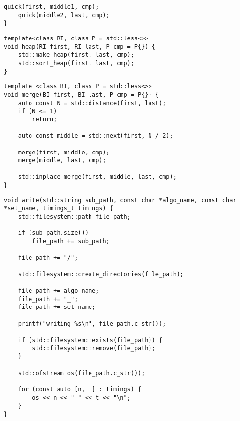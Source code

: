 \begin{appendices}
\begin{lstlisting}[float, label=lst:quick, caption={Implementation des \emph{quicksort}.}]
	quick(first, middle1, cmp);
	quick(middle2, last, cmp);
}
\end{lstlisting}

\begin{lstlisting}[float, label=lst:heap, caption={Implementation des \emph{heapsort}.}]
template<class RI, class P = std::less<>>
void heap(RI first, RI last, P cmp = P{}) {
    std::make_heap(first, last, cmp);
    std::sort_heap(first, last, cmp);
}
\end{lstlisting}

\begin{lstlisting}[float, label=lst:merge, caption={Implementation des \emph{merge sort}.}]
template <class BI, class P = std::less<>>
void merge(BI first, BI last, P cmp = P{}) {
	auto const N = std::distance(first, last);
	if (N <= 1)
		return;

	auto const middle = std::next(first, N / 2);

	merge(first, middle, cmp);
	merge(middle, last, cmp);

	std::inplace_merge(first, middle, last, cmp);
}
\end{lstlisting}

\begin{lstlisting}[float, label=lst:benchmark-write, caption={Implementation einer Funktion zum Speichern des Rückgabewerts von \lstinline{benchmark::run} aus \prettyref{lst:benchmark}.}]
void write(std::string sub_path, const char *algo_name, const char *set_name, timings_t timings) {
	std::filesystem::path file_path;

	if (sub_path.size())
		file_path += sub_path;

	file_path += "/";

	std::filesystem::create_directories(file_path);

	file_path += algo_name;
	file_path += "_";
	file_path += set_name;

	printf("writing %s\n", file_path.c_str());

	if (std::filesystem::exists(file_path)) {
		std::filesystem::remove(file_path);
	}

	std::ofstream os(file_path.c_str());

	for (const auto [n, t] : timings) {
		os << n << " " << t << "\n";
	}
}
\end{lstlisting}

\end{appendices}